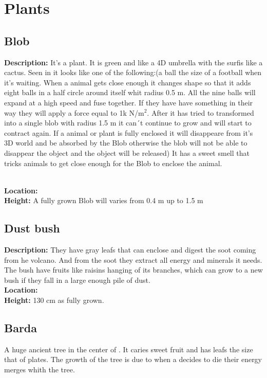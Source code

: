 \documentclass{article}
\begin{document}
\fi

\section{Plants}%

\subsection{Blob}
\label{blob}

\textbf{Description: } It's a  plant. It is green and like a 4D umbrella with the surfis like a cactus. Seen in  it looks like one of the following:(a ball the size of a football when it's waiting. When a animal gets close enough it changes shape so that it adds eight balls in a half circle around itself whit radius 0.5 m. All the nine balls will expand at a high speed and fuse together. If they have have something in their way they will apply a force equal to 1k N/m$^2$. After it has tried to transformed into a single blob with radius 1.5 m it can´t continue to grow and will start to contract again. If a animal or plant is fully enclosed it will disappeare from it's 3D world and be absorbed by the Blob otherwise the blob will not be able to disappear the object and the object will be released)  It has a sweet smell that tricks animals to get close enough for the Blob to enclose the animal. 

\\\textbf{Location: }
\\\textbf{Height: }A fully grown Blob will varies from 0.4 m up to 1.5 m

\subsection{Dust bush}
\label{dust bush}
\textbf{Description: } They have gray leafs that can enclose and digest the soot coming from he volcano. And from the soot they extract all energy and minerals it needs. The bush have fruits like raisins hanging of its branches, which can grow to a new bush if they fall in a large enough pile of dust.
\\\textbf{Location: }
\\\textbf{Height: } 130 cm as fully grown.
\subsection{Barda}
\label{big tree}
A huge ancient tree in the center of . It caries sweet fruit and has leafs the size that of plates. The growth of the tree is due to when a  decides to die their energy merges whith the tree. 
\end{document}
